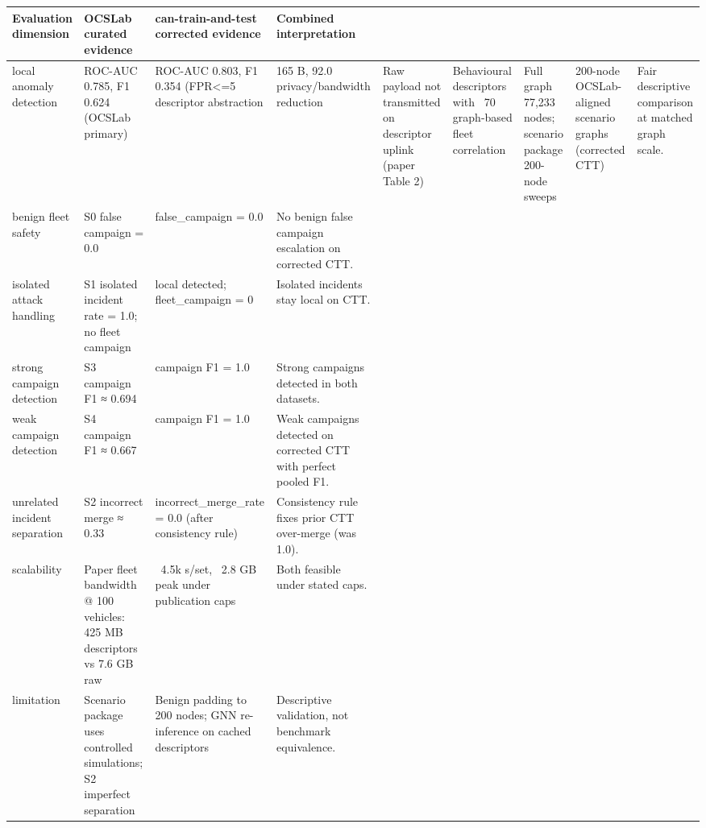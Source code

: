 \begin{tabular}{llll}
\toprule
Evaluation dimension & OCSLab curated evidence & can-train-and-test corrected evidence & Combined interpretation \\
\midrule
local anomaly detection & ROC-AUC 0.785, F1 0.624 (OCSLab primary) & ROC-AUC 0.803, F1 0.354 (FPR<=5%
descriptor abstraction & 165 B, 92.0%
privacy/bandwidth reduction & Raw payload not transmitted on descriptor uplink (paper Table 2) & Behavioural descriptors with ~70%
graph-based fleet correlation & Full graph 77,233 nodes; scenario package 200-node sweeps & 200-node OCSLab-aligned scenario graphs (corrected CTT) & Fair descriptive comparison at matched graph scale. \\
benign fleet safety & S0 false campaign = 0.0 & false_campaign = 0.0 & No benign false campaign escalation on corrected CTT. \\
isolated attack handling & S1 isolated incident rate = 1.0; no fleet campaign & local detected; fleet_campaign = 0 & Isolated incidents stay local on CTT. \\
strong campaign detection & S3 campaign F1 ≈ 0.694 & campaign F1 = 1.0 & Strong campaigns detected in both datasets. \\
weak campaign detection & S4 campaign F1 ≈ 0.667 & campaign F1 = 1.0 & Weak campaigns detected on corrected CTT with perfect pooled F1. \\
unrelated incident separation & S2 incorrect merge ≈ 0.33 & incorrect_merge_rate = 0.0 (after consistency rule) & Consistency rule fixes prior CTT over-merge (was 1.0). \\
scalability & Paper fleet bandwidth @ 100 vehicles: 425 MB descriptors vs 7.6 GB raw & ~4.5k s/set, ~2.8 GB peak under publication caps & Both feasible under stated caps. \\
limitation & Scenario package uses controlled simulations; S2 imperfect separation & Benign padding to 200 nodes; GNN re-inference on cached descriptors & Descriptive validation, not benchmark equivalence. \\
\bottomrule
\end{tabular}
